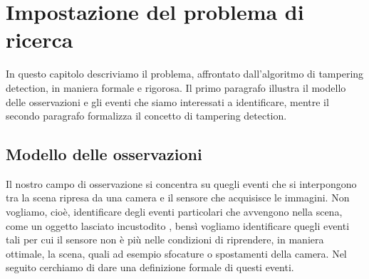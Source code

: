 \chapter{Impostazione del problema di ricerca}
\label{FormulazioneProblema}
\thispagestyle{empty}

\vspace{0.5cm}
In questo capitolo descriviamo il problema, affrontato dall'algoritmo di tampering detection, in maniera formale e rigorosa. Il primo paragrafo illustra il modello delle osservazioni e gli eventi che siamo interessati a identificare, mentre il secondo paragrafo formalizza il concetto di tampering detection. 
\noindent 
\section{Modello delle osservazioni}
Il nostro campo di osservazione si concentra su quegli eventi che si interpongono tra la scena ripresa da una camera e il sensore che acquisisce le immagini. Non vogliamo, cio\`e, identificare degli eventi particolari che avvengono nella scena, come un oggetto lasciato incustodito \cite{Targhe}, bens\`i vogliamo identificare quegli eventi tali per cui il sensore non \`e pi\`u nelle condizioni di riprendere, in maniera ottimale, la scena, quali ad esempio sfocature o spostamenti della camera.
Nel seguito cerchiamo di dare una definizione formale di questi eventi.
